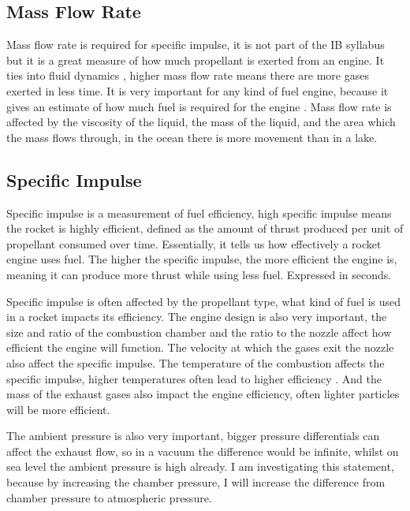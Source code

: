 \documentclass[12pt,a4paper]{article}
\begin{document}
\subsection{Mass Flow Rate}

Mass flow rate is required for specific impulse, it is not part of the IB syllabus but it is a great measure of how much propellant is exerted from an engine. It ties into fluid dynamics \cite{ref6}, higher mass flow rate means there are more gases exerted in less time. It is very important for any kind of fuel engine, because it gives an estimate of how much fuel is required for the engine \cite{ref7}. Mass flow rate is affected by the viscosity of the liquid, the mass of the liquid, and the area which the mass flows through, in the ocean there is more movement than in a lake.

\subsection{Specific Impulse}

Specific impulse is a measurement of fuel efficiency, high specific impulse means the rocket is highly efficient, defined as the amount of thrust produced per unit of propellant consumed over time. Essentially, it tells us how effectively a rocket engine uses fuel. The higher the specific impulse, the more efficient the engine is, meaning it can produce more thrust while using less fuel. Expressed in seconds.

Specific impulse is often affected by the propellant type, what kind of fuel is used in a rocket impacts its efficiency. The engine design is also very important, the size and ratio of the combustion chamber and the ratio to the nozzle affect how efficient the engine will function. The velocity at which the gases exit the nozzle also affect the specific impulse. The temperature of the combustion affects the specific impulse, higher temperatures often lead to higher efficiency \cite{ref9}. And the mass of the exhaust gases also impact the engine efficiency, often lighter particles will be more efficient.

The ambient pressure is also very important, bigger pressure differentials can affect the exhaust flow, so in a vacuum the difference would be infinite, whilst on sea level the ambient pressure is high already. I am investigating this statement, because by increasing the chamber pressure, I will increase the difference from chamber pressure to atmospheric pressure.
\end{document}
